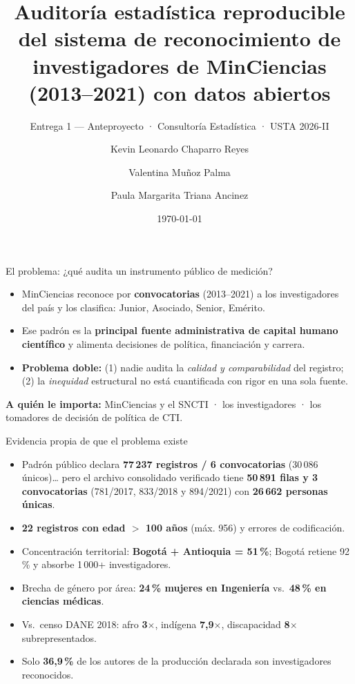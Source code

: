 \documentclass[10pt,aspectratio=169]{beamer}
\title[Auditoría del padrón MinCiencias]{Auditoría estadística reproducible del sistema de reconocimiento de investigadores de MinCiencias (2013--2021) con datos abiertos}
\subtitle{Entrega 1 — Anteproyecto · Consultoría Estadística · USTA 2026-II}
\author[Chaparro · Muñoz · Triana]{Kevin Leonardo Chaparro Reyes \and Valentina Muñoz Palma \and Paula Margarita Triana Ancinez}
\institute{Universidad Santo Tomás}
\date{\today}
\begin{document}
\begin{frame}[plain]
\titlepage
\end{frame}

\begin{frame}{El problema: ¿qué audita un instrumento público de medición?}
\begin{itemize}
  \item MinCiencias reconoce por \textbf{convocatorias} (2013--2021) a los investigadores del país y los clasifica: Junior, Asociado, Senior, Emérito.
  \item Ese padrón es la \textbf{principal fuente administrativa de capital humano científico} y alimenta decisiones de política, financiación y carrera.
  \item \textbf{Problema doble:} (1) nadie audita la \emph{calidad y comparabilidad} del registro; (2) la \emph{inequidad} estructural no está cuantificada con rigor en una sola fuente.
\end{itemize}
\vspace{2mm}
\textbf{A quién le importa:} MinCiencias y el SNCTI · los investigadores · los tomadores de decisión de política de CTI.
\end{frame}

\begin{frame}{Evidencia propia de que el problema existe}
\begin{itemize}
  \item Padrón público declara \textbf{77\,237 registros / 6 convocatorias} (30\,086 únicos)… pero el archivo consolidado verificado tiene \textbf{50\,891 filas y 3 convocatorias} (781/2017, 833/2018 y 894/2021) con \textbf{26\,662 personas únicas}.
  \item \textbf{22 registros con edad $>$ 100 años} (máx. 956) y errores de codificación.
  \item Concentración territorial: \textbf{Bogotá + Antioquia = 51\,\%}; Bogotá retiene 92\,\% y absorbe 1\,000+ investigadores.
  \item Brecha de género por área: \textbf{24\,\% mujeres en Ingeniería} vs.\ \textbf{48\,\% en ciencias médicas}.
  \item Vs.\ censo DANE 2018: afro \textbf{3$\times$}, indígena \textbf{7,9$\times$}, discapacidad \textbf{8$\times$} subrepresentados.
  \item Solo \textbf{36,9\,\%} de los autores de la producción declarada son investigadores reconocidos.
\end{itemize}
\end{frame}
\end{document}
